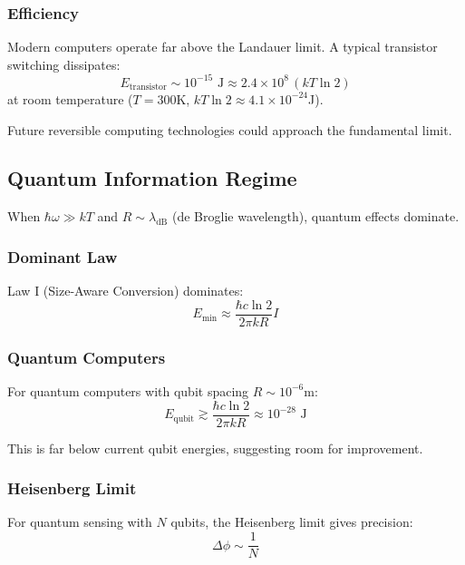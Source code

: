 \documentclass[11pt,a4paper]{article}
\theoremstyle{plain}
\theoremstyle{definition}
\theoremstyle{remark}
\begin{document}
\subsubsection{Efficiency}

Modern computers operate far above the Landauer limit. A typical transistor switching dissipates:
\begin{equation}
E_{\text{transistor}} \sim 10^{-15}\text{ J} \approx 2.4\times 10^8\,(kT\ln 2)
\end{equation}
at room temperature ($T=300$K, $kT\ln 2 \approx 4.1\times 10^{-24}$J).

Future reversible computing technologies could approach the fundamental limit.

\subsection{Quantum Information Regime}

When $\hbar\omega \gg kT$ and $R \sim \lambda_{\text{dB}}$ (de Broglie wavelength), quantum effects dominate.

\subsubsection{Dominant Law}

Law I (Size-Aware Conversion) dominates:
\begin{equation}
E_{\text{min}} \approx \frac{\hbar c\ln 2}{2\pi kR}I
\end{equation}

\subsubsection{Quantum Computers}

For quantum computers with qubit spacing $R \sim 10^{-6}$m:
\begin{equation}
E_{\text{qubit}} \gtrsim \frac{\hbar c\ln 2}{2\pi kR} \approx 10^{-28}\text{ J}
\end{equation}

This is far below current qubit energies, suggesting room for improvement.

\subsubsection{Heisenberg Limit}

For quantum sensing with $N$ qubits, the Heisenberg limit gives precision:
\begin{equation}
\Delta\phi \sim \frac{1}{N}
\end{equation}
\end{document}
